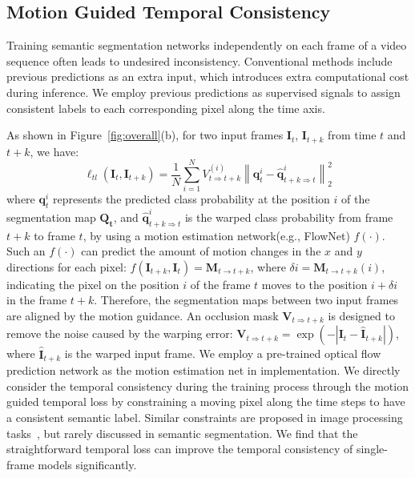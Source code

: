 \documentclass[runningheads]{llncs}
\begin{document}
\subsection{Motion Guided Temporal Consistency}
\label{sec:TL}


Training semantic segmentation networks independently on each frame of a video sequence often leads to undesired inconsistency. Conventional methods include
previous predictions as an extra input, which introduces extra computational cost during inference.
We employ previous predictions as supervised signals to assign consistent labels to each corresponding pixel
along the time axis.

 As shown in Figure~\ref{fig:overall}(b), for two input frames $\mathbf{I}_{t}$, $\mathbf{I}_{t+k}$ from time $t$ and $t+k$, we have:
\begin{equation}
    \ell_{tl}(\mathbf{I}_{t},\mathbf{I}_{t+k})=\frac{1}{N}\sum_{i=1}^{N}V_{t\Rightarrow t+k}^{(i)}\left \|\mathbf{q}_t^{i}-\hat{\mathbf{q}}_{t+k\Rightarrow t}^{i}  \right \|_{2}^{2}
\end{equation}
where $\mathbf{q}_t^{i}$ represents the predicted class probability at the position $i$ of the segmentation map $\mathbf{Q_{t}}$, and $\hat{\mathbf{q}}_{t+k\Rightarrow t}^{i}$ is the warped class probability from frame $t+k$ to frame $t$, by using a motion estimation network(e.g., FlowNet) $f(\cdot)$. Such an $f(\cdot)$ can predict the amount of motion changes in the $x$ and $y$ directions for each pixel: $f(\mathbf{I}_{t+k},\mathbf{I}_{t})=\mathbf{M}_{t \rightarrow t+k}$,
where $\delta i=\mathbf{M}_{t \rightarrow t+k}(i)$, indicating the pixel on the position $i$ of the frame $t$ moves to the position $i+\delta i$ in the frame $t+k$. Therefore,
the segmentation maps between two input frames are aligned by the motion guidance. An occlusion mask $\mathbf{V}_{t\Rightarrow t+k}$ is designed to remove the noise caused by the warping error: $\mathbf{V}_{t\Rightarrow t+k}=\exp(-\left | \mathbf{I}_{t}-
\hat{\mathbf{I}}_{t+k} \right |)$, where $\hat{\mathbf{I}}_{t+k}$ is the warped input frame. We employ a pre-trained optical flow prediction network as the motion estimation net in implementation.
We directly consider the temporal consistency during the training process through the motion guided temporal loss by constraining a moving pixel along the time steps to have a consistent semantic label.
Similar constraints are proposed in image processing tasks~\cite{lai2018learning,yao2017occlusion}, but rarely discussed in semantic segmentation. We find that the straightforward temporal loss can improve the temporal consistency of single-frame models significantly.
\end{document}
